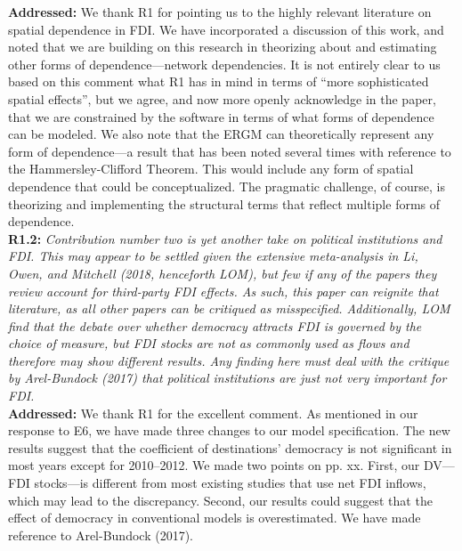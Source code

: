 \documentclass[a4paper,11pt]{texMemo}
\begin{document}
\noindent \textbf{Addressed:}  We thank R1 for pointing us to the highly relevant literature on spatial dependence in FDI. We have incorporated a discussion of this work, and noted that we are building on this research in theorizing about and estimating other forms of dependence---network dependencies. It is not entirely clear to us based on this comment what R1 has in mind in terms of ``more sophisticated spatial effects'', but we agree, and now more openly acknowledge in the paper, that we are constrained by the software in terms of what forms of dependence can be modeled. We also note that the ERGM can theoretically represent any form of dependence---a result that has been noted several times with reference to the Hammersley-Clifford Theorem. This would include any form of spatial dependence that could be conceptualized. The pragmatic challenge, of course, is theorizing and implementing the structural terms that reflect multiple forms of dependence.  \\


\noindent \textbf{R1.2:} \emph{Contribution number two is yet another take on political institutions and FDI. This may appear to be settled given the extensive meta-analysis in Li, Owen, and Mitchell (2018, henceforth LOM), but few if any of the papers they review account for third-party FDI effects. As such, this paper can reignite that literature, as all other papers can be critiqued as misspecified. Additionally, LOM find that the debate over whether democracy attracts FDI is governed by the choice of measure, but FDI stocks are not as commonly used as flows and therefore may show different results. Any finding here must deal with the critique by Arel-Bundock (2017) that political institutions are just not very important for FDI.}\\

\noindent \textbf{Addressed:} We thank R1 for the excellent comment. As mentioned in our response to E6, we have made three changes to our model specification. The new results suggest that the coefficient of destinations' democracy is not significant in most years except for 2010--2012. We made two points on pp. xx. First, our DV---FDI stocks---is different from most existing studies that use net FDI inflows, which may lead to the discrepancy. Second, our results could suggest that the effect of democracy in conventional models is overestimated. We have made reference to Arel-Bundock (2017). \\
\end{document}
